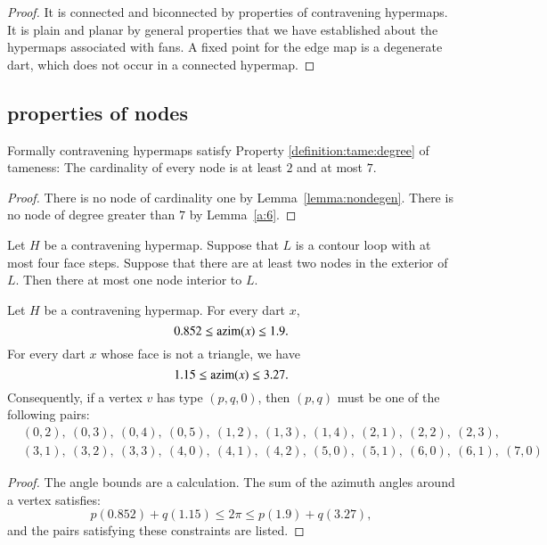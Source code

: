 \begin{proof}
It is connected and biconnected by properties of contravening hypermaps.
It is plain and planar by general properties that we have established
about the hypermaps associated with fans.
A fixed point for the edge map is a degenerate dart, which does not occur in a connected hypermap.
\end{proof}





\subsection{properties of nodes}


\begin{lemma} 
Formally contravening hypermaps satisfy Property
\ref{definition:tame:degree} of tameness: The cardinality of every
node is at least $2$ and at most $7$.
\end{lemma}

\begin{proof}  There is no node of cardinality one by
Lemma~\ref{lemma:nondegen}.  There is no node of degree
greater than $7$ by Lemma~\ref{a:6}.
\end{proof}


\begin{lemma}\label{lemma:no-2}
Let $H$ be a contravening hypermap.
Suppose that $L$ is a contour loop with at most four face steps.
Suppose that there are at least two nodes in the exterior of $L$.
Then there at most one node interior to $L$.
\end{lemma}


\begin{lemma} \label{lemma:0.852}
Let $H$ be a contravening
hypermap. For every dart $x$,
    $$0.852\le {\operatorname{azim}}(x)\le 1.9.$$
For every dart $x$ whose face is not a triangle, we have
    $$1.15\le{\operatorname{azim}}(x)\le 3.27.$$
Consequently, if a vertex $v$ has type $(p,q,0)$, then $(p,q)$
must be one of the following pairs:
$$
\begin{array}{lll}
&(0,2),~(0,3),~(0,4),~(0,5),~(1,2),~(1,3),~(1,4),~(2,1),~(2,2),~(2,3),\\
&(3,1),~(3,2),~(3,3),~(4,0),~(4,1),~(4,2),~(5,0),~(5,1),~(6,0),~(6,1),~(7,0)
\end{array}
$$
\end{lemma}
\begin{proof}
The angle bounds are a calculation.  The sum of the azimuth angles
around a vertex satisfies:
$$
  p (0.852) + q (1.15) \le 2\pi \le p (1.9) + q (3.27),
$$
and the pairs satisfying these constraints are listed.
\end{proof}



